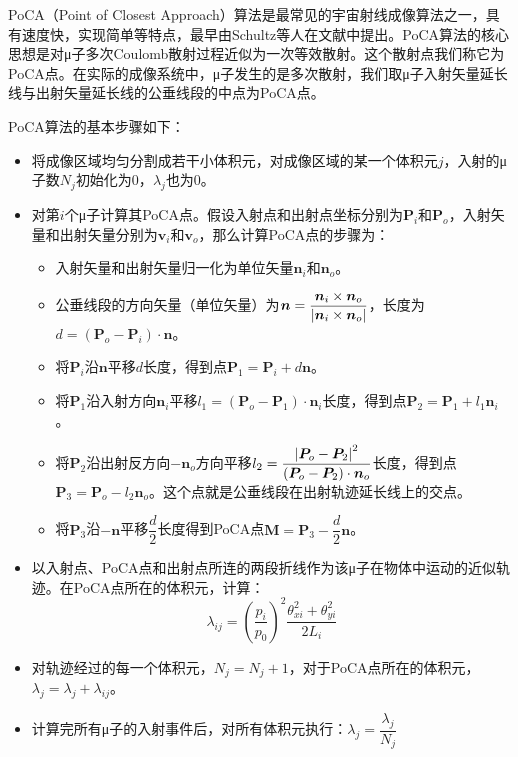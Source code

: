 \documentclass[fontset=none,zihao=-4]{ctexart}
\renewcommand\mathbf\bm
\begin{document}
PoCA（Point of Closest Approach）算法是最常见的宇宙射线成像算法之一，具有速度快，实现简单等特点，最早由Schultz等人在文献\cite{schultz2004image}中提出。PoCA算法的核心思想是对μ子多次Coulomb散射过程近似为一次等效散射。这个散射点我们称它为PoCA点。在实际的成像系统中，μ子发生的是多次散射，我们取μ子入射矢量延长线与出射矢量延长线的公垂线段的中点为PoCA点。

PoCA算法的基本步骤如下：
\begin{itemize}
    \item[\textcircled{1}] 将成像区域均匀分割成若干小体积元，对成像区域的某一个体积元$j$，入射的μ子数$N_j$初始化为0，$\lambda_j$也为0。

    \item[\textcircled{2}] 对第$i$个μ子计算其PoCA点。假设入射点和出射点坐标分别为$\mathbf{P}_i$和$\mathbf{P}_o$，入射矢量和出射矢量分别为$\mathbf{v}_i$和$\mathbf{v}_o$，那么计算PoCA点的步骤为：
    \begin{itemize}
        \item[\bullet] 入射矢量和出射矢量归一化为单位矢量$\mathbf{n}_i$和$\mathbf{n}_o$。
        \item[\bullet] 公垂线段的方向矢量（单位矢量）为$\mathbf{n} = \dfrac{\mathbf{n}_i \times \mathbf{n}_o}{\abs{\mathbf{n}_i \times \mathbf{n}_o}}$，长度为$d = (\mathbf{P}_o - \mathbf{P}_i) \cdot \mathbf{n}$。

        \item[\bullet] 将$\mathbf{P}_i$沿$\mathbf{n}$平移$d$长度，得到点$\mathbf{P}_1 = \mathbf{P}_i + d\mathbf{n}$。

        \item[\bullet] 将$\mathbf{P}_1$沿入射方向$\mathbf{n}_i$平移$l_1 = (\mathbf{P}_o - \mathbf{P}_1) \cdot \mathbf{n}_i$长度，得到点$\mathbf{P}_2 = \mathbf{P}_1 + l_1\mathbf{n}_i$。

        \item[\bullet] 将$\mathbf{P}_2$沿出射反方向$-\mathbf{n}_o$方向平移$l_2 = \dfrac{\abs{\mathbf{P}_o - \mathbf{P}_2}^2}{(\mathbf{P}_o - \mathbf{P}_2) \cdot \mathbf{n}_o}$长度，得到点$\mathbf{P}_3 = \mathbf{P}_o - l_2\mathbf{n}_o$。这个点就是公垂线段在出射轨迹延长线上的交点。

        \item[\bullet] 将$\mathbf{P}_3$沿$-\mathbf{n}$平移$\dfrac{d}{2}$长度得到PoCA点$\mathbf{M} = \mathbf{P}_3 - \dfrac{d}{2}\mathbf{n}$。
    \end{itemize}

    \item[\textcircled{3}] 以入射点、PoCA点和出射点所连的两段折线作为该μ子在物体中运动的近似轨迹。在PoCA点所在的体积元，计算：
    \[
        \lambda_{ij} = \left(\dfrac{p_i}{p_0}\right)^2 \dfrac{\theta_{xi}^2 + \theta_{yi}^2}{2L_i}
    \]

    \item[\textcircled{4}] 对轨迹经过的每一个体积元，$N_j = N_j + 1$，对于PoCA点所在的体积元，$\lambda_j = \lambda_j + \lambda_{ij}$。

    \item[\textcircled{4}] 计算完所有μ子的入射事件后，对所有体积元执行：$\lambda_j = \dfrac{\lambda_j}{N_j}$
\end{itemize}
\end{document}
